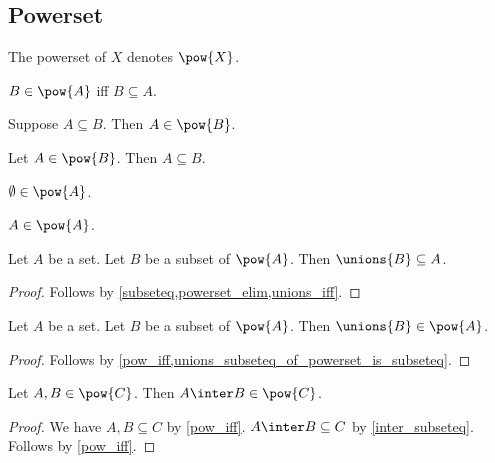 \subsection{Powerset}

\begin{abbreviation}\label{powerset_of}
    The powerset of $X$ denotes $\pow{X}$.
\end{abbreviation}

\begin{axiom}\label{pow_iff}
    $B\in\pow{A}$ iff $B\subseteq A$.
\end{axiom}

\begin{proposition}\label{powerset_intro}
    Suppose $A\subseteq B$.
    Then $A\in\pow{B}$.
\end{proposition}

\begin{proposition}\label{powerset_elim}
    Let $A\in\pow{B}$.
    Then $A\subseteq B$.
\end{proposition}

\begin{proposition}\label{powerset_bottom}
    $\emptyset\in\pow{A}$.
\end{proposition}

\begin{proposition}\label{powerset_top}
    $A\in\pow{A}$.
\end{proposition}

\begin{proposition}\label{unions_subseteq_of_powerset_is_subseteq}
    Let $A$ be a set.
    Let $B$ be a subset of $\pow{A}$.
    Then $\unions{B}\subseteq A$.
\end{proposition}
\begin{proof}
    Follows by \cref{subseteq,powerset_elim,unions_iff}.
\end{proof}

\begin{corollary}\label{powerset_closed_unions}
    Let $A$ be a set.
    Let $B$ be a subset of $\pow{A}$.
    Then $\unions{B}\in\pow{A}$.
\end{corollary}
\begin{proof}
    Follows by \cref{pow_iff,unions_subseteq_of_powerset_is_subseteq}.
\end{proof}


\begin{proposition}\label{inter_powerset}
    Let $A,B\in\pow{C}$.
    Then $A\inter B\in\pow{C}$.
\end{proposition}
\begin{proof}
    We have $A,B\subseteq C$ by \cref{pow_iff}.
    $A\inter B\subseteq C$ by \cref{inter_subseteq}.
    Follows by \cref{pow_iff}.
\end{proof}

